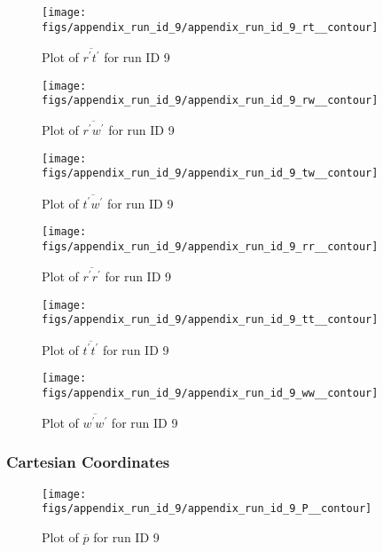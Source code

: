 \begin{figure}[H]
\centering
\texttt{[image: figs/appendix\_run\_id\_9/appendix\_run\_id\_9\_rt\_\_contour]}
\caption{Plot of $\overline{r^\prime t^\prime}$ for run ID 9}
\label{fig:appendix_run_id_9_rt__contour}
\end{figure}


\begin{figure}[H]
\centering
\texttt{[image: figs/appendix\_run\_id\_9/appendix\_run\_id\_9\_rw\_\_contour]}
\caption{Plot of $\overline{r^\prime w^\prime}$ for run ID 9}
\label{fig:appendix_run_id_9_rw__contour}
\end{figure}


\begin{figure}[H]
\centering
\texttt{[image: figs/appendix\_run\_id\_9/appendix\_run\_id\_9\_tw\_\_contour]}
\caption{Plot of $\overline{t^\prime w^\prime}$ for run ID 9}
\label{fig:appendix_run_id_9_tw__contour}
\end{figure}


\begin{figure}[H]
\centering
\texttt{[image: figs/appendix\_run\_id\_9/appendix\_run\_id\_9\_rr\_\_contour]}
\caption{Plot of $\overline{r^\prime r^\prime}$ for run ID 9}
\label{fig:appendix_run_id_9_rr__contour}
\end{figure}


\begin{figure}[H]
\centering
\texttt{[image: figs/appendix\_run\_id\_9/appendix\_run\_id\_9\_tt\_\_contour]}
\caption{Plot of $\overline{t^\prime t^\prime}$ for run ID 9}
\label{fig:appendix_run_id_9_tt__contour}
\end{figure}


\begin{figure}[H]
\centering
\texttt{[image: figs/appendix\_run\_id\_9/appendix\_run\_id\_9\_ww\_\_contour]}
\caption{Plot of $\overline{w^\prime w^\prime}$ for run ID 9}
\label{fig:appendix_run_id_9_ww__contour}
\end{figure}


\subsubsection{Cartesian Coordinates}
\begin{figure}[H]
\centering
\texttt{[image: figs/appendix\_run\_id\_9/appendix\_run\_id\_9\_P\_\_contour]}
\caption{Plot of $\overline{p}$ for run ID 9}
\label{fig:appendix_run_id_9_P__contour}
\end{figure}


